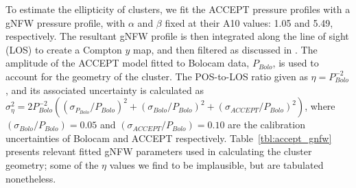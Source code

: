 \documentclass[iop,numberedappendix,apj]{emulateapj}
\begin{document}
To estimate the ellipticity of clusters, we fit the ACCEPT pressure profiles with
a gNFW pressure profile, with $\alpha$ and $\beta$ fixed at their A10 values: 1.05 and 5.49,
respectively. 
The resultant gNFW profile
is then integrated along the line of sight (LOS) to create a Compton $y$ map, and then filtered as 
discussed in \citet{romero2015a}. The amplitude of the ACCEPT model fitted to Bolocam data,
$P_{Bolo}$, is used to account for the geometry of the cluster.
The POS-to-LOS ratio given as $\eta = P_{Bolo}^{-2}$, and its associated uncertainty
is calculated as $\sigma_{\eta}^2 = 2 P_{Bolo}^{-2} ((\sigma_{P_{Bolo}}/P_{Bolo})^2 + 
(\sigma_{Bolo}/P_{Bolo})^2 + (\sigma_{ACCEPT}/P_{Bolo})^2)$, where $(\sigma_{Bolo}/P_{Bolo}) = 0.05$ 
and $(\sigma_{ACCEPT}/P_{Bolo}) = 0.10$ are the calibration uncertainties of Bolocam and ACCEPT 
respectively. Table~\ref{tbl:accept_gnfw} presents relevant fitted gNFW parameters used in calculating
the cluster geometry; some of the $\eta$ values we find to be implausible, but are tabulated nonetheless.
\end{document}
